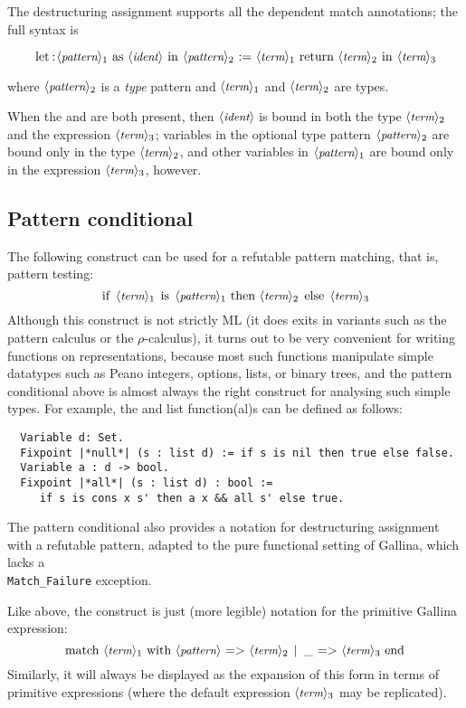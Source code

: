 The \ssr{} destructuring assignment supports all the dependent match
annotations; the  full syntax is

\[ \C{let:} \N{pattern}_1\ \C{as}\ \N{ident}\ \C{in}\ \N{pattern}_2\ \C{:=}\ \N{term}_1\ \C{return}\ \N{term}_2\ \C{in}\ \N{term}_3\]

where $\langle\mbox{\itshape\rmfamily\small pattern}\rangle_2$ is a \emph{type} pattern and $\langle\mbox{\itshape\rmfamily\small term}\rangle_1$ and
$\langle\mbox{\itshape\rmfamily\small term}\rangle_2$ are types.

When the  and  are both present, then $\langle\mbox{\itshape\rmfamily\small ident}\rangle$ is bound
in both the type $\langle\mbox{\itshape\rmfamily\small term}\rangle_2$ and the expression $\langle\mbox{\itshape\rmfamily\small term}\rangle_3$;
variables in the optional type pattern $\langle\mbox{\itshape\rmfamily\small pattern}\rangle_2$ are
bound only in the type $\langle\mbox{\itshape\rmfamily\small term}\rangle_2$, and other variables in $\langle\mbox{\itshape\rmfamily\small pattern}\rangle_1$ are
bound only in the expression $\langle\mbox{\itshape\rmfamily\small term}\rangle_3$, however.

\subsection{Pattern conditional}\label{ssec:patcond}
The following construct can be used for a refutable pattern matching,
that is, pattern testing:
\[\C{if}\ \N{term}_1\ \C{is}\ \N{pattern}_1\ \C{then}\ \N{term}_2\ \C{else}
\ \N{term}_3\]
Although this construct is not strictly ML (it does exits in variants
such as the pattern calculus or the $\rho$-calculus), it turns out to be
very convenient for writing functions on representations,
because most such functions manipulate simple datatypes such as Peano
integers, options,
lists, or binary trees, and the pattern conditional above is almost
always the right construct
for analysing such simple types. For example, the  and
 list function(al)s can be defined as follows:
\begin{lstlisting}
  Variable d: Set.
  Fixpoint |*null*| (s : list d) := if s is nil then true else false.
  Variable a : d -> bool.
  Fixpoint |*all*| (s : list d) : bool :=
     if s is cons x s' then a x && all s' else true.
\end{lstlisting}

The pattern conditional also provides a notation for destructuring
assignment with a refutable pattern, adapted to the pure functional
setting of Gallina, which lacks a \\\texttt{Match\_Failure} exception.

Like  above, the  construct is just (more legible)
notation for the primitive Gallina expression:
\[\C{match}\ \N{term}_1\ \C{with}\ \N{pattern}\ \C{=>}\ \N{term}_2\ \C{| _ =>}\ \N{term}_3\ \C{end}\]
Similarly, it will always be displayed as the expansion of this form
in terms of primitive  expressions (where the default
expression $\langle\mbox{\itshape\rmfamily\small term}\rangle_3$ may be replicated).


